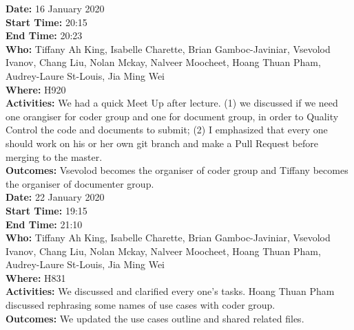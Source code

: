 \documentclass[12pt]{article}
\begin{document}
{\bf Date:} 16 January 2020\\
{\bf Start Time:} 20:15\\
{\bf End Time:}  20:23\\
{\bf Who:} Tiffany Ah King,
Isabelle Charette,
Brian Gamboc-Javiniar,
Vsevolod Ivanov,
Chang Liu,
Nolan Mckay,
Nalveer Moocheet,
Hoang Thuan Pham,
Audrey-Laure St-Louis,
Jia Ming Wei\\
{\bf Where:} H920 \\
{\bf Activities:} We had a quick Meet Up after lecture. (1) we discussed if we need one orangiser for coder group and one for document group, in order to Quality Control the code and documents to submit; (2) I emphasized that every one should work on his or her own git branch and make a Pull Request before merging to the master.\\
{\bf Outcomes:} Vsevolod becomes the organiser of coder group and Tiffany becomes the organiser of documenter group. \\

{\bf Date:} 22 January 2020\\
{\bf Start Time:} 19:15\\
{\bf End Time:}  21:10\\
{\bf Who:} Tiffany Ah King,
Isabelle Charette,
Brian Gamboc-Javiniar,
Vsevolod Ivanov,
Chang Liu,
Nolan Mckay,
Nalveer Moocheet,
Hoang Thuan Pham,
Audrey-Laure St-Louis,
Jia Ming Wei\\
{\bf Where:} H831 \\
{\bf Activities:}  We discussed and clarified every one's tasks. Hoang Thuan Pham discussed rephrasing some names of use cases with coder group.  \\
{\bf Outcomes:} We updated the use cases outline and shared related files.\\


\end{document}
